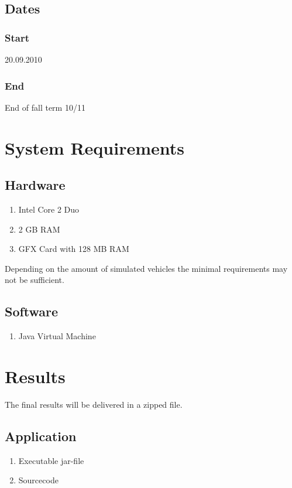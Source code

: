 \documentclass[a4paper,10pt,titlepage]{article}
\begin{document}
\subsection{Dates}

\subsubsection{Start}
20.09.2010

\subsubsection{End}
End of fall term 10/11

\section{System Requirements}

\subsection{Hardware}
\begin{enumerate}
 \item Intel Core 2 Duo
 \item 2 GB RAM
 \item GFX Card with 128 MB RAM
\end{enumerate}

Depending on the amount of simulated vehicles the minimal requirements may not be sufficient.


\subsection{Software}
\begin{enumerate}
 \item Java Virtual Machine
\end{enumerate}


\section{Results}

The final results will be delivered in a zipped file.

\subsection{Application}
\begin{enumerate}
 \item Executable jar-file%
 \item Sourcecode
\end{enumerate}
\end{document}
